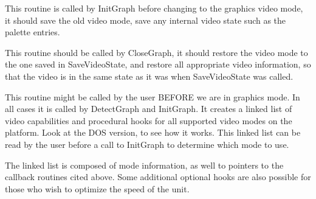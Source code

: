 
This routine is called by InitGraph before changing to the graphics video
mode, it should save the old video mode, save any internal video state
such as the palette entries.


This routine should be called by CloseGraph, it should restore the video
mode to the one saved in SaveVideoState, and restore all appropriate video
information, so that the video is in the same state as it was when
SaveVideoState was called.


This routine might be called by the user BEFORE we are in graphics
mode. In all cases it is called by DetectGraph and InitGraph. It
creates a linked list of video capabilities and procedural hooks for
all supported video modes on the platform. Look at the DOS version,
to see how it works. This linked list can be read by the user before a
call to InitGraph to determine which mode to use.

The linked list is composed of mode information, as well to pointers
to the callback routines cited above. Some additional optional hooks
are also possible for those who wish to optimize the speed of the unit.


